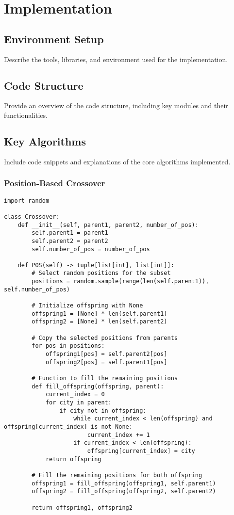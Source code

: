 \documentclass[12pt]{article}
\begin{document}
\section{Implementation}
\subsection{Environment Setup}
Describe the tools, libraries, and environment used for the implementation.

\subsection{Code Structure}
Provide an overview of the code structure, including key modules and their functionalities.

\subsection{Key Algorithms}
Include code snippets and explanations of the core algorithms implemented.

\subsubsection{Position-Based Crossover}
\begin{lstlisting}[caption=Position-Based Crossover Implementation]
import random

class Crossover:
    def __init__(self, parent1, parent2, number_of_pos):
        self.parent1 = parent1
        self.parent2 = parent2
        self.number_of_pos = number_of_pos

    def POS(self) -> tuple[list[int], list[int]]:
        # Select random positions for the subset
        positions = random.sample(range(len(self.parent1)), self.number_of_pos)
        
        # Initialize offspring with None
        offspring1 = [None] * len(self.parent1)
        offspring2 = [None] * len(self.parent2)
        
        # Copy the selected positions from parents
        for pos in positions:
            offspring1[pos] = self.parent2[pos]
            offspring2[pos] = self.parent1[pos]
        
        # Function to fill the remaining positions
        def fill_offspring(offspring, parent):
            current_index = 0
            for city in parent:
                if city not in offspring:
                    while current_index < len(offspring) and offspring[current_index] is not None:
                        current_index += 1
                    if current_index < len(offspring):
                        offspring[current_index] = city
            return offspring
        
        # Fill the remaining positions for both offspring
        offspring1 = fill_offspring(offspring1, self.parent1)
        offspring2 = fill_offspring(offspring2, self.parent2)
        
        return offspring1, offspring2
\end{lstlisting}
\end{document}
